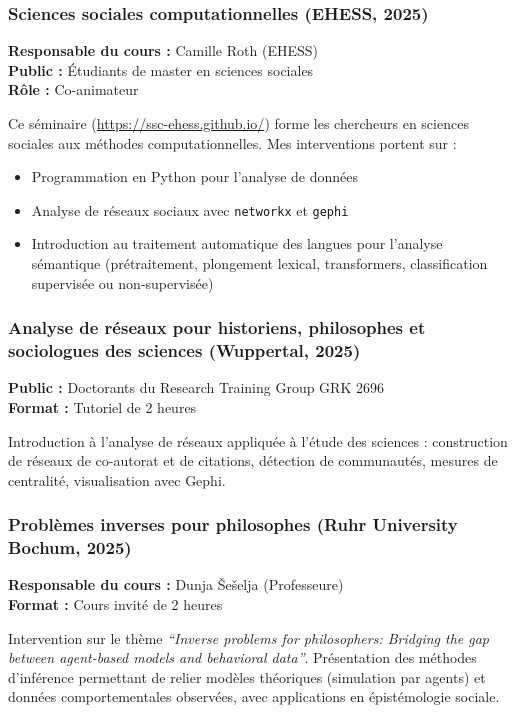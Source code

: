 \documentclass[11pt,a4paper]{article}
\begin{document}
\subsubsection{Sciences sociales computationnelles (EHESS, 2025)}

\textbf{Responsable du cours :} Camille Roth (EHESS)\\
\textbf{Public :} Étudiants de master en sciences sociales\\
\textbf{Rôle :} Co-animateur 

Ce séminaire (\url{https://ssc-ehess.github.io/}) forme les chercheurs en sciences sociales aux méthodes computationnelles. Mes interventions portent sur :
\begin{itemize}[nosep]
    \item Programmation en Python pour l'analyse de données
    \item Analyse de réseaux sociaux avec \texttt{networkx} et \texttt{gephi}
    \item Introduction au traitement automatique des langues pour l'analyse sémantique (prétraitement, plongement lexical, transformers, classification supervisée ou non-supervisée)
\end{itemize}

\subsubsection{Analyse de réseaux pour historiens, philosophes et sociologues des sciences (Wuppertal, 2025)}

\noindent\textbf{Public :} Doctorants du Research Training Group GRK 2696\\
\textbf{Format :} Tutoriel de 2 heures

Introduction à l'analyse de réseaux appliquée à l'étude des sciences : construction de réseaux de co-autorat et de citations, détection de communautés, mesures de centralité, visualisation avec Gephi.

\subsubsection{Problèmes inverses pour philosophes (Ruhr University Bochum, 2025)}

\textbf{Responsable du cours :} Dunja Šešelja (Professeure)\\
\textbf{Format :} Cours invité de 2 heures

Intervention sur le thème \textit{``Inverse problems for philosophers: Bridging the gap between agent-based models and behavioral data''}. Présentation des méthodes d'inférence permettant de relier modèles théoriques (simulation par agents) et données comportementales observées, avec applications en épistémologie sociale.
\end{document}
